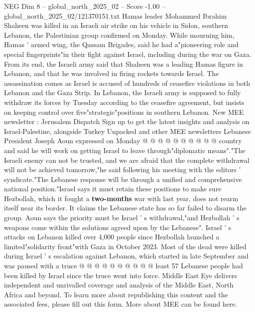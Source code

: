 \begin{textsample}{NEG Dim 8 – global\_north\_2025\_02 – Score -1.00 – global\_north\_2025\_02/121370151.txt}  \label{ex:f8_neg_148}
Hamas leader Mohammed Ibrahim Shaheen was killed in an Israeli air strike on his vehicle in Sidon, southern Lebanon, the Palestinian group confirmed on Monday.
While mourning him, Hamas ' armed wing, the Qassam Brigades, said he had a"pioneering role and special fingerprints"in their fight against Israel, including during the war on Gaza.
From its end, the Israeli army said that Shaheen was a leading Hamas figure in Lebanon, and that he was involved in firing rockets towards Israel.
The assassination comes as Israel is accused of hundreds of ceasefire violations in both Lebanon and the Gaza Strip.
In Lebanon, the Israeli army is supposed to fully withdraw its forces by Tuesday according to the ceasefire agreement, but insists on keeping control over five"strategic"positions in southern Lebanon.
New MEE newsletter : Jerusalem Dispatch Sign up to get the latest insights and analysis on Israel-Palestine, alongside Turkey Unpacked and other MEE newsletters Lebanese President Joseph Aoun expressed on Monday @ @ @ @ @ @ @ @ @ @ country and said he will work on getting Israel to leave through"diplomatic means"."The Israeli enemy can not be trusted, and we are afraid that the complete withdrawal will not be achieved tomorrow,"he said following his meeting with the editors ' syndicate."The Lebanese response will be through a unified and comprehensive national position."Israel says it must retain these positions to make sure Hezbollah, which it fought a \textbf{two-months} war with last year, does not rearm itself near its border.
It claims the Lebanese state has so far failed to disarm the group.
Aoun says the priority must be Israel ' s withdrawal,"and Hezbollah ' s weapons come within the solutions agreed upon by the Lebanese".
Israel ' s attacks on Lebanon killed over 4,000 people since Hezbollah launched a limited"solidarity front"with Gaza in October 2023.
Most of the dead were killed during Israel ' s escalation against Lebanon, which started in late September and was paused with a truce @ @ @ @ @ @ @ @ @ @ least 57 Lebanese people had been killed by Israel since the truce went into force.
Middle East Eye delivers independent and unrivalled coverage and analysis of the Middle East, North Africa and beyond.
To learn more about republishing this content and the associated fees, please fill out this form.
More about MEE can be found here.

\end{textsample}
